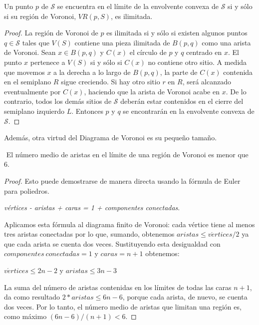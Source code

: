 \begin{lema}
	Un punto $p$ de $\mathcal{S}$ se encuentra en el límite de la envolvente convexa de $\mathcal{S}$ si y sólo si su región de Voronoi, $VR(p,S)$, es ilimitada. \vspace{0.3cm}
	
	\begin{proof}
		La región de Voronoi de $p$ es ilimitada si y sólo si existen algunos puntos $q \in \mathcal{S}$ tales que $V(S)$ contiene una pieza ilimitada de $B(p,q)$ como una arista de Voronoi. Sean $x \in B(p,q)$ y $C(x)$ el círculo de $p$ y $q$ centrado en $x$. El punto $x$ pertenece a $V(S)$ si y sólo si $C(x)$ no contiene otro sitio. A medida que movemos $x$ a la derecha a lo largo de $B(p,q)$, la parte de $C(x)$ contenida en el semiplano $R$ sigue creciendo. Si hay otro sitio $r$ en $R$, será alcanzado eventualmente por $C(x)$, haciendo que la arista de Voronoi acabe en $x$.  
		De lo contrario, todos los demás sitios de $\mathcal{S}$ deberán estar contenidos en el cierre del semiplano izquierdo $L$. Entonces $p$ y $q$ se encontrarán en la envolvente convexa de $\mathcal{S}$.
	\end{proof}	
\end{lema}

Además, otra virtud del Diagrama de Voronoi es su pequeño tamaño.

\begin{lema}$\label{lema43}$
	El número medio de aristas en el límite de una región de Voronoi es menor que 6.
	\vspace{0.3cm}
	
	\begin{proof}
		Esto puede demostrarse de manera directa usando la fórmula de Euler para poliedros.
		\begin{center} \textit{vértices - aristas + caras =  1 + componentes conectadas}.\end{center}
		
		Aplicamos esta fórmula al diagrama finito de Voronoi: cada vértice tiene al menos tres aristas conectadas por lo que, sumando, obtenemos $aristas \leq v\acute{e}rtices/2$ ya que cada arista se cuenta dos veces. Sustituyendo esta desigualdad con $componentes \ conectadas = 1$ y $caras = n+1$ obtenemos:
		
		\begin{center} $v\acute{e}rtices \leq 2n-2$ y $aristas \leq 3n-3$ \end{center}
		
		La suma del número de aristas contenidas en los límites de todas las caras $n+1$, da como resultado $2*aristas \leq 6n-6$, porque cada arista, de nuevo, se cuenta dos veces. Por lo tanto, el número medio de aristas que limitan una región es, como máximo $(6n-6)/(n+1) < 6$.
	\end{proof}
\end{lema}

